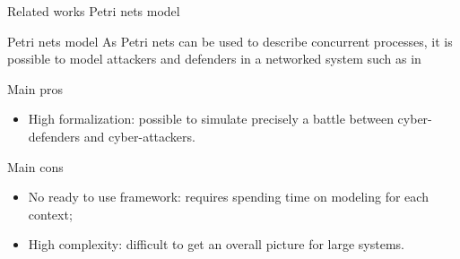 	\begin{frame}{Related works}
		{Petri nets model}

            \begin{block}{Petri nets model}
                As Petri nets can be used to describe concurrent processes, it is possible to model attackers and defenders in a networked system such as in ~\cite{SYamaguchi2020}
            \end{block}

            \begin{prosblock}{Main pros}
                \begin{itemize}
                    \item High formalization: possible to simulate precisely a battle between cyber-defenders and cyber-attackers. 
                \end{itemize}
            \end{prosblock}

            \begin{consblock}{Main cons}
                \begin{itemize}
                    \item No ready to use framework: requires spending time on modeling for each context;
                    \item High complexity: difficult to get an overall picture for large systems.
                \end{itemize}
            \end{consblock}

	\end{frame}

